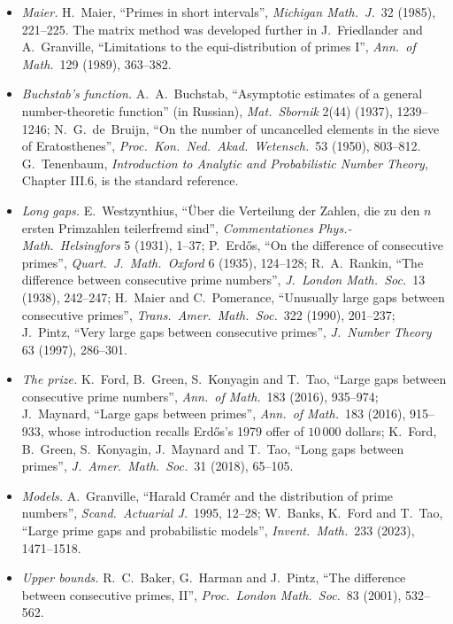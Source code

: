 \begin{itemize}
\item \emph{Maier.} H.~Maier, ``Primes in short intervals'', \emph{Michigan Math.\ J.}\ 32 (1985), 221--225. The matrix method was developed further in J.~Friedlander and A.~Granville, ``Limitations to the equi-distribution of primes I'', \emph{Ann.\ of Math.}\ 129 (1989), 363--382.
\item \emph{Buchstab's function.} A.~A.~Buchstab, ``Asymptotic estimates of a general number-theoretic function'' (in Russian), \emph{Mat.\ Sbornik} 2(44) (1937), 1239--1246; N.~G.~de~Bruijn, ``On the number of uncancelled elements in the sieve of Eratosthenes'', \emph{Proc.\ Kon.\ Ned.\ Akad.\ Wetensch.}\ 53 (1950), 803--812. G.~Tenenbaum, \emph{Introduction to Analytic and Probabilistic Number Theory}, Chapter III.6, is the standard reference.
\item \emph{Long gaps.} E.~Westzynthius, ``Über die Verteilung der Zahlen, die zu den $n$ ersten Primzahlen teilerfremd sind'', \emph{Commentationes Phys.-Math.\ Helsingfors} 5 (1931), 1--37; P.~Erd\H{o}s, ``On the difference of consecutive primes'', \emph{Quart.\ J.\ Math.\ Oxford} 6 (1935), 124--128; R.~A.~Rankin, ``The difference between consecutive prime numbers'', \emph{J.\ London Math.\ Soc.}\ 13 (1938), 242--247; H.~Maier and C.~Pomerance, ``Unusually large gaps between consecutive primes'', \emph{Trans.\ Amer.\ Math.\ Soc.}\ 322 (1990), 201--237; J.~Pintz, ``Very large gaps between consecutive primes'', \emph{J.\ Number Theory} 63 (1997), 286--301.
\item \emph{The prize.} K.~Ford, B.~Green, S.~Konyagin and T.~Tao, ``Large gaps between consecutive prime numbers'', \emph{Ann.\ of Math.}\ 183 (2016), 935--974; J.~Maynard, ``Large gaps between primes'', \emph{Ann.\ of Math.}\ 183 (2016), 915--933, whose introduction recalls Erd\H{o}s's 1979 offer of $10\,000$ dollars; K.~Ford, B.~Green, S.~Konyagin, J.~Maynard and T.~Tao, ``Long gaps between primes'', \emph{J.\ Amer.\ Math.\ Soc.}\ 31 (2018), 65--105.
\item \emph{Models.} A.~Granville, ``Harald Cramér and the distribution of prime numbers'', \emph{Scand.\ Actuarial J.}\ 1995, 12--28; W.~Banks, K.~Ford and T.~Tao, ``Large prime gaps and probabilistic models'', \emph{Invent.\ Math.}\ 233 (2023), 1471--1518.
\item \emph{Upper bounds.} R.~C.~Baker, G.~Harman and J.~Pintz, ``The difference between consecutive primes, II'', \emph{Proc.\ London Math.\ Soc.}\ 83 (2001), 532--562.
\end{itemize}
